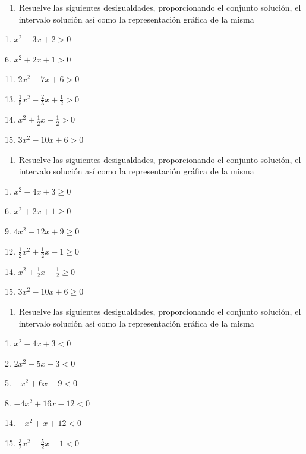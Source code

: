 \documentclass[]{book}
\providecommand{\tightlist}{%
  \setlength{\itemsep}{0pt}\setlength{\parskip}{0pt}}
\begin{document}
\begin{enumerate}
\def\labelenumi{\arabic{enumi}.}
\setcounter{enumi}{26}
\tightlist
\item
  Resuelve las siguientes desigualdades, proporcionando el conjunto
  solución, el intervalo solución así como la representación gráfica de
  la misma
\end{enumerate}

\begin{multicols}{2}
1. $x^2-3x+2>0$

6. $x^2+2x+1>0$

11. $2x^2-7x+6>0$

13. $\frac{1}{5}x^2-\frac{2}{5}x+\frac{1}{2}>0$

14. $x^2+\frac{1}{2}x-\frac{1}{2}>0$

15. $3x^2-10x+6>0$
\end{multicols}

\begin{enumerate}
\def\labelenumi{\arabic{enumi}.}
\setcounter{enumi}{27}
\tightlist
\item
  Resuelve las siguientes desigualdades, proporcionando el conjunto
  solución, el intervalo solución así como la representación gráfica de
  la misma
\end{enumerate}

\begin{multicols}{2}
1. $x^2-4x+3\geq 0$

6. $x^2+2x+1\geq 0$

9. $4x^2-12x+9\geq 0$

12. $\frac{1}{2}x^2+\frac{1}{2}x-1\geq 0$

14. $x^2+\frac{1}{2}x-\frac{1}{2}\geq 0$

15. $3x^2-10x+6\geq 0$
\end{multicols}

\begin{enumerate}
\def\labelenumi{\arabic{enumi}.}
\setcounter{enumi}{28}
\tightlist
\item
  Resuelve las siguientes desigualdades, proporcionando el conjunto
  solución, el intervalo solución así como la representación gráfica de
  la misma
\end{enumerate}

\begin{multicols}{2}
1. $x^2-4x+3<0$

2. $2x^2-5x-3<0$

5. $-x^2+6x-9<0$

8. $-4x^2+16x-12<0$

14. $-x^2+x+12<0$

15. $\frac{3}{2}x^2-\frac{5}{2}x-1<0$
\end{multicols}
\end{document}
